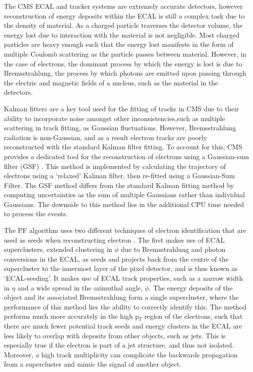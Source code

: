 The CMS ECAL and tracker systems are extremely accurate detectors, however reconstruction of energy deposits within the ECAL is still a complex task due to the density of material. As a charged particle traverses the detector volume, the energy lost due to interaction with the material is not negligible. Most charged particles are heavy enough such that the energy lost manifests in the form of multiple Coulomb scattering as the particle passes between material. However, in the case of electrons, the dominant process by which the energy is lost is due to Bremsstrahlung, the process by which photons are emitted upon passing through the electric and magnetic fields of a nucleus, such as the material in the detectors. 

Kalman fitters are a key tool used for the fitting of tracks in CMS due to their ability to incorporate noise amongst other inconsistencies,such as multiple scattering in track fitting, as Gaussian fluctuations. However, Bremsstrahlung radiation is non-Gaussian, and as a result electron tracks are poorly reconstructed with the standard Kalman filter fitting. To account for this, CMS provides a dedicated tool for the reconstruction of electrons using a Gaussian-sum filter (GSF) \cite{0954-3899-31-9-N01}. This method is implemented by calculating the trajectory of electrons using a `relaxed' Kalman filter, then re-fitted using a Gaussian-Sum Filter. The GSF method differs from the standard Kalman fitting method by computing uncertainties as the sum of multiple Gaussians rather than individual Gaussians. The downside to this method lies in the additional CPU time needed to process the events. 

The PF algorithm uses two different techniques of electron identification that are used as seeds when reconstructing electron \cite{CMS-PAS-PFT-10-003}. The first makes use of ECAL superclusters, extended clustering in $\phi$ due to Bremsstrahlung and photon conversions in the ECAL, as seeds and projects back from the centre of the supercluster to the innermost layer of the pixel detector, and is thus known as `ECAL-seeding'. It makes use of ECAL track properties, such as a narrow width in $\eta$ and a wide spread in the azimuthal angle, $\phi$. The energy deposits of the object and its associated Bremsstrahlung form a single supercluster, where the performance of this method lies the ability to correctly identify this. The method performs much more accurately in the high p$_T$ region of the electrons, such that there are much fewer potential track seeds and energy clusters in the ECAL are less likely to overlap with deposits from other objects, such as jets. This is especially true if the electron is part of a jet structure, and thus not isolated. Moreover, a high track multiplicity can complicate the backwards propagation from a supercluster and mimic the signal of another object.

